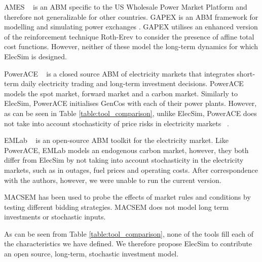 AMES ~\cite{Sun2007} is an ABM specific to the US Wholesale Power Market Platform and therefore not generalizable for other countries. GAPEX \cite{Cincotti2013} is an ABM framework for modelling and simulating power exchanges . GAPEX utilises an enhanced version of the reinforcement technique Roth-Erev \cite{RothAE1995} to consider the presence of affine total cost functions. However, neither of these model the long-term dynamics for which ElecSim is designed.



PowerACE ~\cite{Rothengatter2007} is a closed source ABM of electricity markets that integrates short-term daily electricity trading and long-term investment decisions. PowerACE models the spot market, forward market and a carbon market. Similarly to ElecSim, PowerACE initialises GenCos with each of their power plants. However, as can be seen in Table \ref{table:tool_comparison}, unlike ElecSim, PowerACE does not take into account stochasticity of price risks in electricity markets ~\cite{Most2010}.

EMLab ~\cite{Chappin2017} is an open-source ABM toolkit for the electricity market. Like PowerACE, EMLab models an endogenous carbon market, however, they both differ from ElecSim by not taking into account stochasticity in the electricity markets, such as in outages, fuel prices and operating costs. After correspondence with the authors, however, we were unable to run the current version.

MACSEM \cite{Praca2003} has been used to probe the effects of market rules and conditions by testing different bidding strategies. MACSEM does not model long term investments or stochastic inputs.


As can be seen from Table \ref{table:tool_comparison}, none of the tools fill each of the characteristics we have defined. We therefore propose ElecSim to contribute an open source, long-term, stochastic investment model. 

